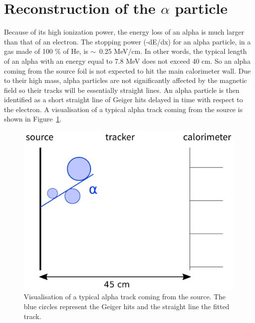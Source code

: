 \documentclass[main.tex]{subfiles}
\begin{document}


\section{Reconstruction of the $\alpha$ particle}\label{sec:ReconstructionAlphaParticle}


Because of its high ionization power, the energy loss of an alpha is much larger than that of an electron. The stopping power (-dE/dx) for an alpha particle, in a gas made of 100 \% of He, is $\sim$~0.25 MeV/cm. In other words, the typical length of an alpha with an energy equal to 7.8 MeV does not exceed 40 cm. So an alpha coming from the source foil is not expected to hit the main calorimeter wall. Due to their high mass, alpha particles are not significantly affected by the magnetic field so their tracks will be essentially straight lines. An alpha particle is then identified as a short straight line of Geiger hits delayed in time with respect to the electron. A visualisation of a typical alpha track coming from the source is shown in Figure~\ref{visu_alpha_typical_track}.


\begin{figure}[h!]
\begin{center}
\includegraphics[scale=0.60]{pictures/Chap5/alpha_comic.pdf}
\caption{Visualisation of a typical alpha track coming from the source. The blue circles represent the Geiger hits and the straight line the fitted track.}
\label{visu_alpha_typical_track}
\end{center}
\end{figure}
\end{document}
